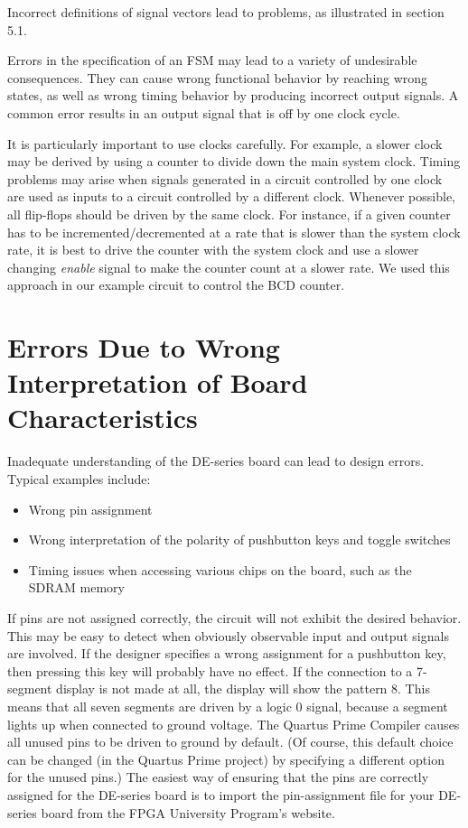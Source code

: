 \documentclass[11pt, twoside, pdftex]{article}
\begin{document}
Incorrect definitions of signal vectors lead to problems, as illustrated in
section 5.1.

Errors in the specification of an FSM may lead to a variety of undesirable
consequences. They can cause wrong functional behavior by reaching wrong states,
as well as wrong timing behavior by producing incorrect output signals.
A common error results in an output signal that is off by one clock cycle.

It is particularly important to use clocks carefully. For example, a slower
clock may be derived by using a counter to divide down the main system clock.
Timing problems may arise when signals generated in a circuit controlled
by one clock are used as inputs to a circuit controlled by a different clock.
Whenever possible, all flip-flops should be driven by the same clock.
For instance, if a given counter has to be incremented/decremented at a rate that 
is slower than the system clock rate, it is best to drive the counter with the 
system clock and use a slower changing {\it enable} signal to make the
counter count at a slower rate. We used this approach in our example circuit
to control the BCD counter.

\section{Errors Due to Wrong Interpretation of Board Characteristics}
Inadequate understanding of the DE-series board can lead to design errors.
Typical examples include:
\begin{itemize}
\item Wrong pin assignment
\item Wrong interpretation of the polarity of pushbutton keys and toggle switches
\item Timing issues when accessing various chips on the board, such as the SDRAM memory
\end{itemize}

If pins are not assigned correctly, the circuit will not exhibit the desired 
behavior. This may be easy to detect when obviously observable input and output signals
are involved. If the designer specifies a wrong assignment for a pushbutton key,
then pressing this key will probably have no effect. If the connection to 
a 7-segment display is not made at all, the display will show the pattern 8.
This means that all seven segments are driven by a logic 0 signal, because a
segment lights up when connected to ground voltage. The Quartus Prime Compiler
causes all unused pins to be driven to ground by default. (Of course, this
default choice can be changed (in the Quartus Prime project) by specifying a 
different option for the unused pins.) The easiest way of ensuring that the pins
are correctly assigned for the DE-series board is to import the pin-assignment file 
for your DE-series board from the FPGA University Program's website.
\end{document}
